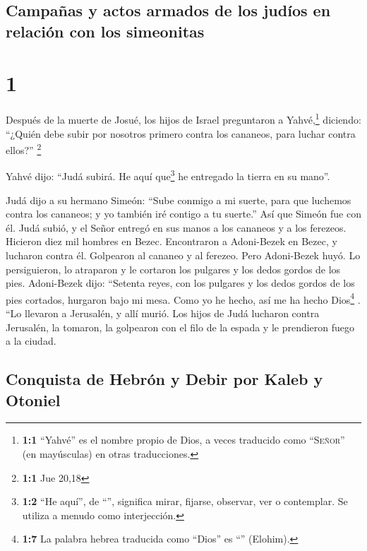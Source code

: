 \hypertarget{campauxf1as-y-actos-armados-de-los-juduxedos-en-relaciuxf3n-con-los-simeonitas}{%
\subsection{Campañas y actos armados de los judíos en relación con los
simeonitas}\label{campauxf1as-y-actos-armados-de-los-juduxedos-en-relaciuxf3n-con-los-simeonitas}}

\hypertarget{section}{%
\section{1}\label{section}}

 Después de la muerte de Josué, los hijos de Israel
preguntaron a Yahvé,\footnote{\textbf{1:1} ``Yahvé'' es el nombre propio
  de Dios, a veces traducido como ``\textsc{Señor}'' (en mayúsculas) en
  otras traducciones.} diciendo: ``¿Quién debe subir por nosotros
primero contra los cananeos, para luchar contra ellos?'' \footnote{\textbf{1:1}
  Jue 20,18}

 Yahvé dijo: ``Judá subirá. He aquí que\footnote{\textbf{1:2}
  ``He aquí'', de ``'', significa mirar, fijarse, observar,
  ver o contemplar. Se utiliza a menudo como interjección.} he entregado
la tierra en su mano''.

 Judá dijo a su hermano Simeón: ``Sube conmigo a mi
suerte, para que luchemos contra los cananeos; y yo también iré contigo
a tu suerte.'' Así que Simeón fue con él.  Judá subió, y
el Señor entregó en sus manos a los cananeos y a los ferezeos. Hicieron
diez mil hombres en Bezec.  Encontraron a Adoni-Bezek en
Bezec, y lucharon contra él. Golpearon al cananeo y al ferezeo.
 Pero Adoni-Bezek huyó. Lo persiguieron, lo atraparon y le
cortaron los pulgares y los dedos gordos de los pies. 
Adoni-Bezek dijo: ``Setenta reyes, con los pulgares y los dedos gordos
de los pies cortados, hurgaron bajo mi mesa. Como yo he hecho, así me ha
hecho Dios\footnote{\textbf{1:7} La palabra hebrea traducida como
  ``Dios'' es ``'' (Elohim).} . ``Lo llevaron a Jerusalén,
y allí murió.  Los hijos de Judá lucharon contra
Jerusalén, la tomaron, la golpearon con el filo de la espada y le
prendieron fuego a la ciudad.

\hypertarget{conquista-de-hebruxf3n-y-debir-por-kaleb-y-otoniel}{%
\subsection{Conquista de Hebrón y Debir por Kaleb y
Otoniel}\label{conquista-de-hebruxf3n-y-debir-por-kaleb-y-otoniel}}

